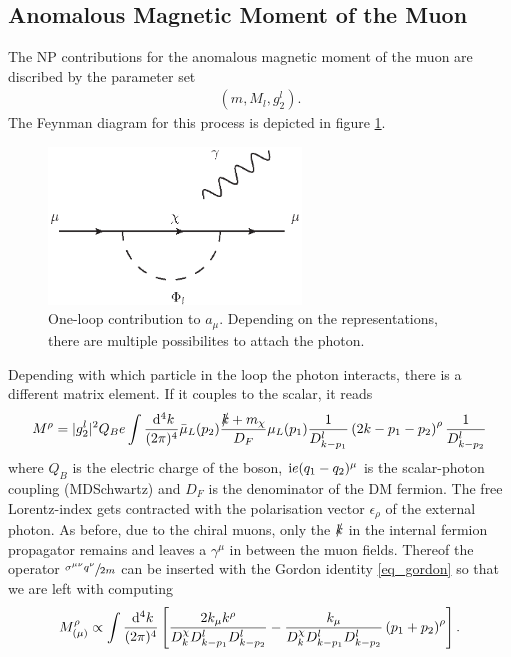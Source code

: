 \subsection{Anomalous Magnetic Moment of the Muon}
The NP contributions for the anomalous magnetic moment of the muon are discribed by the parameter set 
\begin{align}
 \left(m, M_l, g_2^l\right).
\end{align}
The Feynman diagram for this process is depicted in figure \ref{pic_g-2}. 
\begin{figure}[t]
 \includegraphics[width=0.6\textwidth]{../pics/g-2.eps}
 \caption{One-loop contribution to $a_\mu$. Depending on the representations, there are multiple possibilites to attach the photon.}
 \label{pic_g-2}
\end{figure}
Depending with which particle in the loop the photon interacts, there is a different matrix element. If it couples to the scalar, it reads
\begin{align}
 M^\rho = |g_2^l|^2 Q_B e \int \frac{\; \mathrm{d}^4 k}{(2\pi)^4} \bar\mu_L(p_2) \frac{\slashed{k}+m_\chi}{D_F}\mu_L(p_1) \frac{1}{D^l_{k-p_1}}\left(2k-p_1-p_2\right)^\rho\frac{1}{D^l_{k-p_2}}
\end{align}
where $Q_B$ is the electric charge of the boson, $\text{i} e(q_1-q_2)^\mu$ is the scalar-photon coupling (MDSchwartz) and $D_F$ is the denominator of the
DM fermion. The free Lorentz-index gets contracted with
the polarisation vector $\epsilon_\rho$ of the external photon. As before, due to the chiral muons, only the $\slashed{k}$ in the internal fermion
propagator remains and leaves a $\gamma^\mu$ in between the muon fields. Thereof the operator $\sfrac{\sigma^{\mu\nu}q^\nu}{2m}$ can be inserted with the Gordon 
identity \eqref{eq_gordon} so that we are left with computing 
\begin{align}
 M^\rho_{(\mu)} \propto \int\frac{\; \mathrm{d}^4 k}{(2\pi)^4} \left[ \frac{2k_\mu k^\rho}{D^\chi_kD^l_{k-p_1}D^l_{k-p_2}} - \frac{k_\mu}{D^\chi_kD^l_{k-p_1}D^l_{k-p_2}}\left(p_1 +p_2\right)^\rho \right].
\end{align}
